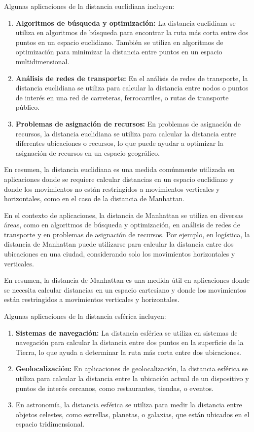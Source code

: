 Algunas aplicaciones de la distancia euclidiana incluyen:

\begin{enumerate}
\item \textbf{ Algoritmos de búsqueda y optimización:} La distancia euclidiana se utiliza en algoritmos de búsqueda para encontrar la ruta más corta entre dos puntos en un espacio euclidiano. También se utiliza en algoritmos de optimización para minimizar la distancia entre puntos en un espacio multidimensional.
\item \textbf{ Análisis de redes de transporte:} En el análisis de redes de transporte, la distancia euclidiana se utiliza para calcular la distancia entre nodos o puntos de interés en una red de carreteras, ferrocarriles, o rutas de transporte público.
\item \textbf{Problemas de asignación de recursos:} En problemas de asignación de recursos, la distancia euclidiana se utiliza para calcular la distancia entre diferentes ubicaciones o recursos, lo que puede ayudar a optimizar la asignación de recursos en un espacio geográfico.
\end{enumerate}

En resumen, la distancia euclidiana es una medida comúnmente utilizada en aplicaciones donde se requiere calcular distancias en un espacio euclidiano y donde los movimientos no están restringidos a movimientos verticales y horizontales, como en el caso de la distancia de Manhattan.

En el contexto de aplicaciones, la distancia de Manhattan se utiliza en diversas áreas, como en algoritmos de búsqueda y optimización, en análisis de redes de transporte y en problemas de asignación de recursos. Por ejemplo, en logística, la distancia de Manhattan puede utilizarse para calcular la distancia entre dos ubicaciones en una ciudad, considerando solo los movimientos horizontales y verticales.

En resumen, la distancia de Manhattan es una medida útil en aplicaciones donde se necesita calcular distancias en un espacio cartesiano y donde los movimientos están restringidos a movimientos verticales y horizontales.

Algunas aplicaciones de la distancia esférica incluyen:

\begin{enumerate}
	\item \textbf{Sistemas de navegación:} La distancia esférica se utiliza en sistemas de navegación para calcular la distancia entre dos puntos en la superficie de la Tierra, lo que ayuda a determinar la ruta más corta entre dos ubicaciones.
	\item \textbf{Geolocalización:} En aplicaciones de geolocalización, la distancia esférica se utiliza para calcular la distancia entre la ubicación actual de un dispositivo y puntos de interés cercanos, como restaurantes, tiendas, o eventos.
	\item {} En astronomía, la distancia esférica se utiliza para medir la distancia entre objetos celestes, como estrellas, planetas, o galaxias, que están ubicados en el espacio tridimensional.
\end{enumerate}

